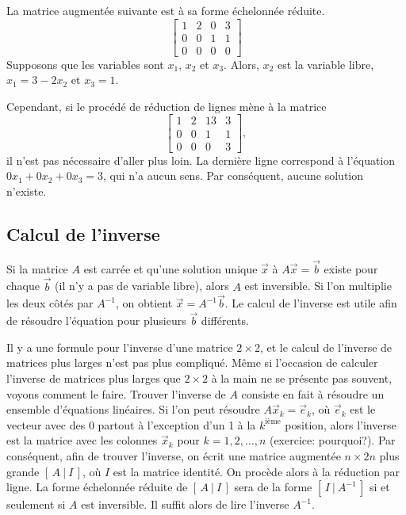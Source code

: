 \begin{example}
La matrice augmentée suivante est à sa forme échelonnée réduite.
\begin{equation*}
\left[
\begin{array}{ccc|c}
1 & 2 & 0 & 3 \\
0 & 0 & 1 & 1 \\
0 & 0 & 0 & 0
\end{array}
\right]
\end{equation*}
Supposons que les variables sont $x_1$, $x_2$ et $x_3$. Alors, $x_2$ est la variable libre, $x_1 = 3 - 2x_2$ et $x_3 = 1$.

\medskip

Cependant, si le procédé de réduction de lignes mène à la matrice
\begin{equation*}
\left[
\begin{array}{ccc|c}
1 & 2 & 13 & 3 \\
0 & 0 & 1 & 1 \\
0 & 0 & 0 & 3
\end{array}
\right]
,
\end{equation*}
il n'est pas nécessaire d'aller plus loin. La dernière ligne correspond à l'équation $0 x_1 + 0 x_2 + 0 x_3 = 3$, qui n'a aucun sens. Par conséquent, aucune solution n'existe.
\end{example}

\subsection{Calcul de l'inverse}

Si la matrice $A$ est carrée et qu'une solution unique
$\vec{x}$ à $A \vec{x} = \vec{b}$ existe pour chaque $\vec{b}$ (il n'y a pas de variable libre), alors $A$ est inversible.
Si l'on multiplie les deux côtés par $A^{-1}$, on obtient $\vec{x} =
A^{-1} \vec{b}$. Le calcul de l'inverse est utile afin de résoudre l'équation pour plusieurs $\vec{b}$ différents.

Il y a une formule pour l'inverse d'une matrice $2 \times 2$, et le calcul de l'inverse de matrices plus larges n'est pas plus compliqué. Même si l'occasion de calculer l'inverse de matrices plus larges que $2 \times 2$ à la main ne se présente pas souvent, voyons comment le faire. Trouver l'inverse de $A$ consiste en fait à résoudre un ensemble d'équations linéaires. Si l'on peut résoudre $A \vec{x}_k = \vec{e}_k$, où $\vec{e}_k$ est le vecteur avec des 0 partout à l'exception d'un 1 à la $k^{\text{ième}}$ position, alors l'inverse est la matrice avec les colonnes $\vec{x}_k$ pour $k=1,2,\ldots,n$
(exercice: pourquoi?). Par conséquent, afin de trouver l'inverse, on écrit une matrice augmentée $n
\times 2n$ plus grande $[ \,A ~|~ I\, ]$, où $I$ est la matrice identité. On procède alors à la réduction par ligne. La forme échelonnée réduite de $[ \,A ~|~ I\, ]$ 
sera de la forme $[ \,I ~|~ A^{-1}\, ]$ si et seulement si
$A$ est inversible. Il suffit alors de lire l'inverse $A^{-1}$.


